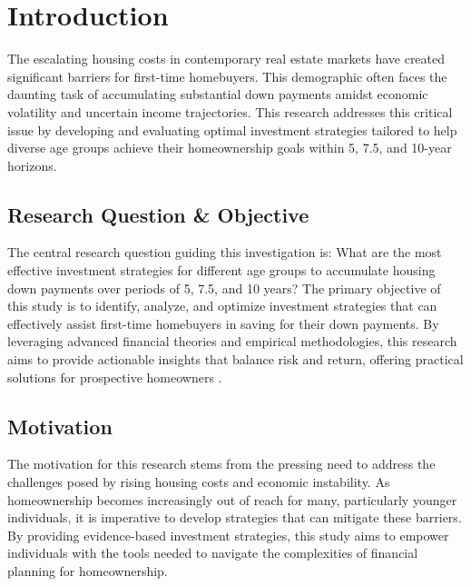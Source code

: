 \section{Introduction}
The escalating housing costs in contemporary real estate markets have created significant barriers for first-time homebuyers. This demographic often faces the daunting task of accumulating substantial down payments amidst economic volatility and uncertain income trajectories. This research addresses this critical issue by developing and evaluating optimal investment strategies tailored to help diverse age groups achieve their homeownership goals within 5, 7.5, and 10-year horizons.

\subsection{Research Question \& Objective}
The central research question guiding this investigation is: What are the most effective investment strategies for different age groups to accumulate housing down payments over periods of 5, 7.5, and 10 years? The primary objective of this study is to identify, analyze, and optimize investment strategies that can effectively assist first-time homebuyers in saving for their down payments. By leveraging advanced financial theories and empirical methodologies, this research aims to provide actionable insights that balance risk and return, offering practical solutions for prospective homeowners \citep{markowitz1952portfolio, sharpe1964capital, boyle1977options}.

\subsection{Motivation}
The motivation for this research stems from the pressing need to address the challenges posed by rising housing costs and economic instability. As homeownership becomes increasingly out of reach for many, particularly younger individuals, it is imperative to develop strategies that can mitigate these barriers. By providing evidence-based investment strategies, this study aims to empower individuals with the tools needed to navigate the complexities of financial planning for homeownership.

\newpage
